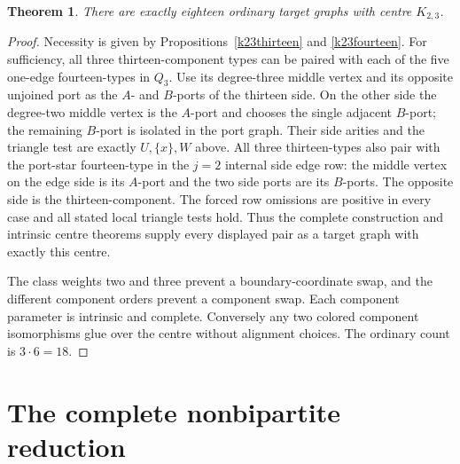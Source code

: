 \documentclass[11pt]{article}
\newtheorem{theorem}{Theorem}
\begin{document}
\begin{theorem}\label{k23count}
There are exactly eighteen ordinary target graphs with centre $K_{2,3}$.
\end{theorem}
\begin{proof}
Necessity is given by Propositions~\ref{k23thirteen} and
\ref{k23fourteen}. For sufficiency, all three thirteen-component types
can be paired with each of the five one-edge fourteen-types in $Q_3$.
Use its degree-three middle vertex and its opposite unjoined port as
the $A$- and $B$-ports of the thirteen side. On the other side the
degree-two middle vertex is the $A$-port and chooses the single adjacent
$B$-port; the remaining $B$-port is isolated in the port graph. Their
side arities and the triangle test are exactly $U,\{x\},W$ above.
All three thirteen-types also pair with the port-star fourteen-type
in the $j=2$ internal side edge row: the middle vertex on the edge
side is its $A$-port and the two side ports are its $B$-ports. The
opposite side is the thirteen-component. The forced row omissions
are positive in every case and all stated local triangle tests hold.
Thus the complete construction and intrinsic centre theorems supply
every displayed pair as a target graph with exactly this centre.

The class weights two and three prevent a boundary-coordinate swap,
and the different component orders prevent a component swap. Each
component parameter is intrinsic and complete. Conversely any two
colored component isomorphisms glue over the centre without alignment
choices. The ordinary count is $3\cdot6=18$.
\end{proof}

\section{The complete nonbipartite reduction}
\end{document}
